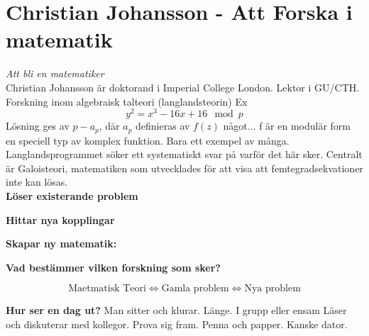 \chapter{Christian Johansson - Att Forska i matematik}
\textit{Att bli en matematiker}\\

\noindent Christian Johansson är doktorand i Imperial College London. Lektor i GU/CTH. Forskning inom algebraisk talteori (langlandsteorin)
Ex
$$y^2=x^3-16x+16 \mod{p}$$
Lösning ges av $p-a_p$, där $a_p$ definieras av
$f(z)$ något...
f är en modulär form \textemdash en speciell typ av komplex funktion.
Bara ett exempel av många. \\Langlandsprogrammet söker ett systematiskt svar på varför det här sker.
Centralt är Galoisteori, matematiken som utvecklades för att visa att femtegradsekvationer inte kan lösas.\\
\textbf{Löser existerande problem}

\textbf{Hittar nya kopplingar}

\textbf{Skapar ny matematik:}

\textbf{Vad bestämmer vilken forskning som sker?}

$$\text{Maetmatisk Teori}\iff \text{Gamla problem} \iff \text{Nya problem}$$

\textbf{Hur ser en dag ut?}
Man sitter och klurar. Länge. I grupp eller ensam
Läser och diskuterar med kollegor. Prova sig fram. Penna och papper. Kanske dator.

